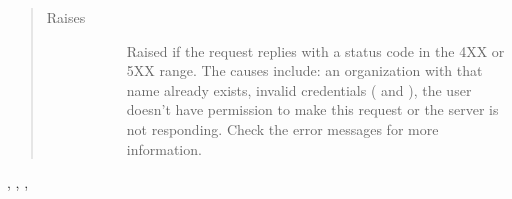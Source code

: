 \documentclass[letterpaper,10pt,english]{sphinxmanual}
\begin{document}
\begin{fulllineitems}
\begin{quote}
\begin{description}
\item[{Raises}] \leavevmode\begin{description}
\item[{}] \leavevmode
Raised if the request replies with a status code in the 4XX or 5XX range.
The causes include: an organization with that name already exists, invalid
credentials ( and ), the user doesn’t have permission to
make this request or the server is not responding. Check the error messages
for more information.

\end{description}

\end{description}\end{quote}




, {\hyperref[\detokenize{grafanaAPI:grafanaAPI.setUserRoleOrg}]{}}, {\hyperref[\detokenize{grafanaAPI:grafanaAPI.getExistingUserId}]{}}, {\hyperref[\detokenize{grafanaAPI:grafanaAPI.removeFromOrg}]{}}



\end{fulllineitems}

\end{document}
